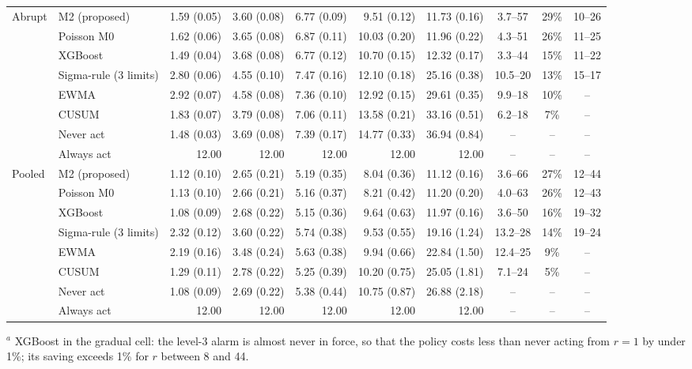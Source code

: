 {\begin{tabular}{llrrrrrccc}
\addlinespace
Abrupt & M2 (proposed) & 1.59 (0.05) & 3.60 (0.08) & 6.77 (0.09) & 9.51 (0.12) & 11.73 (0.16) & 3.7--57 & 29\% & 10--26 \\
 & Poisson M0 & 1.62 (0.06) & 3.65 (0.08) & 6.87 (0.11) & 10.03 (0.20) & 11.96 (0.22) & 4.3--51 & 26\% & 11--25 \\
 & XGBoost & 1.49 (0.04) & 3.68 (0.08) & 6.77 (0.12) & 10.70 (0.15) & 12.32 (0.17) & 3.3--44 & 15\% & 11--22 \\
 & Sigma-rule (3 limits) & 2.80 (0.06) & 4.55 (0.10) & 7.47 (0.16) & 12.10 (0.18) & 25.16 (0.38) & 10.5--20 & 13\% & 15--17 \\
 & EWMA & 2.92 (0.07) & 4.58 (0.08) & 7.36 (0.10) & 12.92 (0.15) & 29.61 (0.35) & 9.9--18 & 10\% & -- \\
 & CUSUM & 1.83 (0.07) & 3.79 (0.08) & 7.06 (0.11) & 13.58 (0.21) & 33.16 (0.51) & 6.2--18 & 7\% & -- \\
 & Never act & 1.48 (0.03) & 3.69 (0.08) & 7.39 (0.17) & 14.77 (0.33) & 36.94 (0.84) & -- & -- & -- \\
 & Always act & 12.00 & 12.00 & 12.00 & 12.00 & 12.00 & -- & -- & -- \\
\addlinespace
Pooled & M2 (proposed) & 1.12 (0.10) & 2.65 (0.21) & 5.19 (0.35) & 8.04 (0.36) & 11.12 (0.16) & 3.6--66 & 27\% & 12--44 \\
 & Poisson M0 & 1.13 (0.10) & 2.66 (0.21) & 5.16 (0.37) & 8.21 (0.42) & 11.20 (0.20) & 4.0--63 & 26\% & 12--43 \\
 & XGBoost & 1.08 (0.09) & 2.68 (0.22) & 5.15 (0.36) & 9.64 (0.63) & 11.97 (0.16) & 3.6--50 & 16\% & 19--32 \\
 & Sigma-rule (3 limits) & 2.32 (0.12) & 3.60 (0.22) & 5.74 (0.38) & 9.53 (0.55) & 19.16 (1.24) & 13.2--28 & 14\% & 19--24 \\
 & EWMA & 2.19 (0.16) & 3.48 (0.24) & 5.63 (0.38) & 9.94 (0.66) & 22.84 (1.50) & 12.4--25 & 9\% & -- \\
 & CUSUM & 1.29 (0.11) & 2.78 (0.22) & 5.25 (0.39) & 10.20 (0.75) & 25.05 (1.81) & 7.1--24 & 5\% & -- \\
 & Never act & 1.08 (0.09) & 2.69 (0.22) & 5.38 (0.44) & 10.75 (0.87) & 26.88 (2.18) & -- & -- & -- \\
 & Always act & 12.00 & 12.00 & 12.00 & 12.00 & 12.00 & -- & -- & -- \\
\bottomrule
\end{tabular}}

$^{a}$ XGBoost in the gradual cell: the level-3 alarm is almost never in force, so that the policy costs less than never acting from $r = 1$ by under 1\%; its saving exceeds 1\% for $r$ between 8 and 44.

